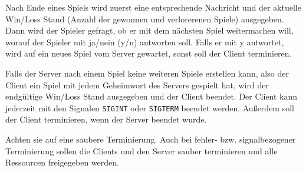 Nach Ende eines Spiels wird zuerst eine entsprechende Nachricht und der aktuelle Win/Loss Stand (Anzahl der gewonnen und verlorerenen Spiele) ausgegeben. Dann 
wird der Spieler gefragt, ob er mit dem nächsten Spiel weitermachen will, worauf der Spieler mit ja/nein (y/n) 
antworten soll. Falls er mit y antwortet, wird auf ein neues Spiel vom Server gewartet, sonst soll
der Client terminieren.

Falls der Server nach einem Spiel keine weiteren Spiele erstellen kann, also der Client ein 
Spiel mit jedem Geheimwort des Servers gespielt hat, wird der endgültige Win/Loss Stand ausgegeben und der 
Client beendet. Der Client kann jederzeit mit den Signalen \verb|SIGINT| oder \verb|SIGTERM| beendet 
werden. Außerdem soll der Client terminieren, wenn der Server beendet wurde.


Achten sie auf eine saubere Terminierung. Auch bei fehler- bzw. signalbezogener Terminierung sollen die 
Clients und den Server sauber terminieren und alle Ressourcen freigegeben werden.

\osueguidelinesthree



